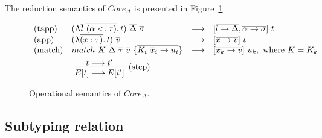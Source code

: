 \documentclass[11pt]{article}
\newcommand{\ap}{~}
\begin{document}
    The reduction semantics of $Core_\Delta$ is presented in Figure\ \ref{fig:core-operational}.

    \begin{figure}
        \begin{gather*}
            \begin{array}{llll}
                \text{(tapp)} & (\Lambda \overline{l}~\overline{(\alpha <: \tau)}\ldotp t)\ap \overline{\Delta} \ap \overline{\sigma} & \longrightarrow & [\overline{l \to \Delta}, \overline{\alpha\to\sigma}]\ap t
                \\
                \text{(app)} & (\lambda \overline{(x : \tau)}\ldotp t) \ap \overline{v} & \longrightarrow & [\overline{x\to v}]\ap t
                \\
                \text{(match)} & match ~K \ap\Delta\ap\overline{\tau}\ap \overline{v} ~ \{ \overline{K_i \ap \overline{x}_i \to u_i}\} & \longrightarrow & [\overline{x_k\to v}]\ap u_k, \text{ where } K = K_k
            \end{array}\\
            \hspace{-15em}\infer[\text{(step)}]{E[t]\longrightarrow E[t']}{t\longrightarrow t'}
        \end{gather*}
        \caption{Operational semantics of $Core_\Delta$.}
        \label{fig:core-operational}
    \end{figure}

    \subsection{Subtyping relation}
\end{document}
